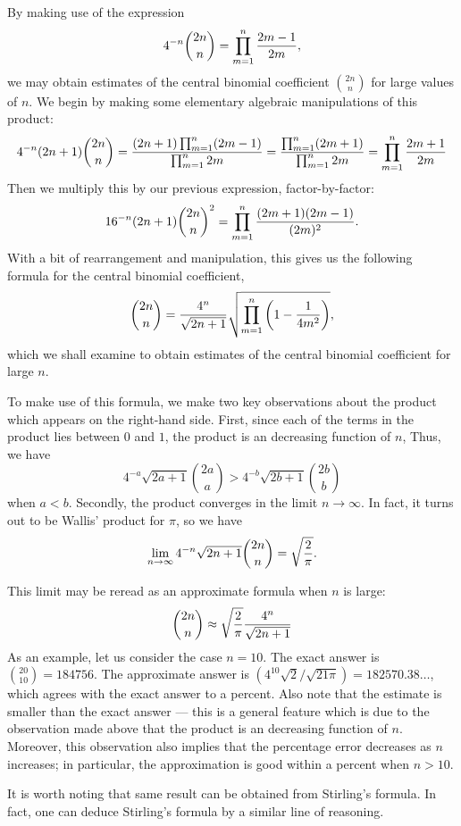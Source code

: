 \documentclass[12pt]{article}
\begin{document}
By making use of the expression 
\[
 4^{-n} {2n \choose n} = \prod_{m=1}^n {2m - 1 \over 2m}  ,
\]
we may obtain estimates of the central binomial 
coefficient ${2n \choose n}$ for large values of $n$.
We begin by making some elementary algebraic 
manipulations of this product:
\[
 4^{-n} (2n+1) {2n \choose n} = {(2n+1) \prod_{m=1}^n (2m-1) \over
\prod_{m=1}^n 2m} = {\prod_{m=1}^n (2m+1) \over \prod_{m=1}^n 2m} =
\prod_{m=1}^n {2m+1 \over 2m}
\]
Then we multiply this by our previous expression, factor-by-factor:
\[
 16^{-n} (2n+1) {2n \choose n}^2 = \prod_{m=1}^n {(2m+1) (2m-1)
\over (2m)^2} .
\]
With a bit of rearrangement and manipulation, this gives
us the following formula for the central binomial coefficient,
\[
 {2n \choose n} = {4^n \over \sqrt{2n+1}} \sqrt{ \prod_{m=1}^n 
 \left( 1 - {1 \over 4 m^2} \right)} ,
\]
which we shall examine to obtain estimates of the central
binomial coefficient for large $n$.

To make use of this formula, we make two key observations
about the product which appears on the right-hand side.
First, since each of the terms in the product lies between
$0$ and $1$, the product is an decreasing function of $n$,
Thus, we have            
\[
 4^{-a} \sqrt{2a+1} {2a \choose a} > 
 4^{-b} \sqrt{2b+1} {2b \choose b}
\]
when $a < b$.  Secondly, the product converges in the limit
$n \to \infty$.  In fact, it turns out to be Wallis' product
for $\pi$, so we have
\[
 \lim_{n \to \infty}
 4^{-n} \sqrt{2n+1} {2n \choose n} =
 \sqrt{2 \over \pi} .
\]

This limit may be reread as an approximate formula when
$n$ is large:
\[
 {2n \choose n} \approx 
 \sqrt{2 \over \pi} 
 {4^n \over \sqrt{2n+1}}
\]
As an example, let us consider the case $n=10$.  The
exact answer is ${20 \choose 10} = 184756$.  The approximate
answer is $(4^{10} \sqrt{2}/\sqrt{21 \pi}) = 182570.38\ldots$,
which agrees with the exact answer to a percent.  Also
note that the estimate is smaller than the exact answer ---
this is a general feature which is due to the observation
made above that the product is an decreasing function of $n$.
Moreover, this observation also implies that the percentage 
error decreases as $n$ increases; in particular, the approximation
is good within a percent when $n > 10$.

It is worth noting that same result can be obtained from Stirling's 
formula.  In fact, one can deduce Stirling's formula by a similar 
line of reasoning.
\end{document}
